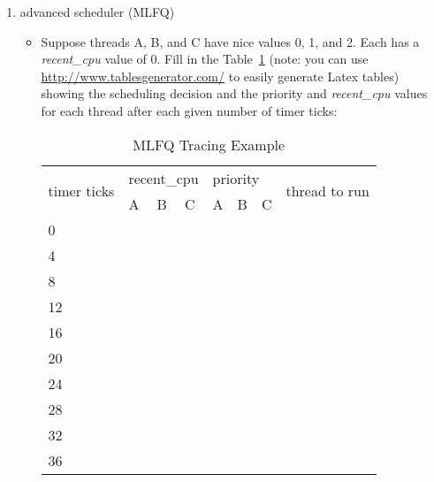 \begin{enumerate}
    \item advanced scheduler (MLFQ)
        \begin{itemize}
            \item Suppose threads A, B, and C have nice values 0, 1, and 2. Each has a \textit{recent\_cpu} value of 0.  Fill in the Table~\ref{tlb:mlfq-tracing}  (note: you can use \url{http://www.tablesgenerator.com/} to easily generate Latex tables) showing the scheduling decision and the priority and \textit{recent\_cpu} values for each thread after each given number of timer ticks:

\begin{table}[]
\centering
\caption{MLFQ Tracing Example}
\label{tlb:mlfq-tracing}
\begin{tabular}{|l|l|l|l|l|l|l|l|}
\hline
\multirow{2}{*}{timer ticks} & \multicolumn{3}{l|}{recent\_cpu} & \multicolumn{3}{l|}{priority} & \multirow{2}{*}{thread to run} \\ \cline{2-7}
                             & A         & B         & C        & A        & B        & C       &                                \\ \hline
0                            &           &           &          &          &          &         &                                \\ \hline
4                            &           &           &          &          &          &         &                                \\ \hline
8                            &           &           &          &          &          &         &                                \\ \hline
12                           &           &           &          &          &          &         &                                \\ \hline
16                           &           &           &          &          &          &         &                                \\ \hline
20                           &           &           &          &          &          &         &                                \\ \hline
24                           &           &           &          &          &          &         &                                \\ \hline
28                           &           &           &          &          &          &         &                                \\ \hline
32                           &           &           &          &          &          &         &                                \\ \hline
36                           &           &           &          &          &          &         &                                \\ \hline
\end{tabular}
\end{table}



\end{itemize}
\end{enumerate}
